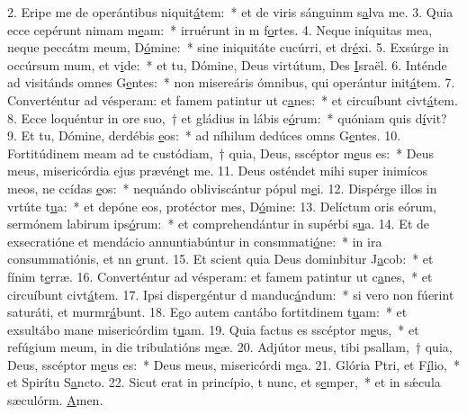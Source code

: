 2. Eripe me de operántibus niquit\uline{á}tem:~* et de viris sánguinm s\uline{a}lva me.
3. Quia ecce cepérunt nimam m\uline{e}am:~* irruérunt in m f\uline{o}rtes.
4. Neque iníquitas mea, neque peccátm meum, D\uline{ó}mine:~* sine iniquitáte cucúrri, et dr\uline{é}xi.
5. Exsúrge in occúrsum mum, et v\uline{i}de:~* et tu, Dómine, Deus virtútum, Des \uline{I}sraël.
6. Inténde ad visitánds omnes G\uline{e}ntes:~* non misereáris ómnibus, qui operántur init\uline{á}tem.
7. Converténtur ad vésperam: et famem patintur ut c\uline{a}nes:~* et circuíbunt civt\uline{á}tem.
8. Ecce loquéntur in ore suo,~† et gládius in lábis e\uline{ó}rum:~* quóniam quis d\uline{í}vit?
9. Et tu, Dómine, derdébis \uline{e}os:~* ad níhilum dedúces omns G\uline{e}ntes.
10. Fortitúdinem meam ad te custódiam,~† quia, Deus, sscéptor m\uline{e}us es:~* Deus meus, misericórdia ejus prævén\uline{e}t me.
11. Deus osténdet mihi super inimícos meos, ne ccídas \uline{e}os:~* nequándo obliviscántur pópul m\uline{e}i.
12. Dispérge illos in vrtúte t\uline{u}a:~* et depóne eos, protéctor mes, D\uline{ó}mine:
13. Delíctum oris eórum, sermónem labirum ips\uline{ó}rum:~* et comprehendántur in supérbi s\uline{u}a.
14. Et de exsecratióne et mendácio annuntiabúntur in consmmati\uline{ó}ne:~* in ira consummatiónis, et nn \uline{e}runt.
15. Et scient quia Deus dominbitur J\uline{a}cob:~* et fínim t\uline{e}rræ.
16. Converténtur ad vésperam: et famem patintur ut c\uline{a}nes,~* et circuíbunt civt\uline{á}tem.
17. Ipsi dispergéntur d manduc\uline{á}ndum:~* si vero non fúerint saturáti, et murmr\uline{á}bunt.
18. Ego autem cantábo fortitdinem t\uline{u}am:~* et exsultábo mane misericórdim t\uline{u}am.
19. Quia factus es sscéptor m\uline{e}us,~* et refúgium meum, in die tribulatións m\uline{e}æ.
20. Adjútor meus, tibi psallam,~† quia, Deus, sscéptor m\uline{e}us es:~* Deus meus, misericórdi m\uline{e}a.
21. Glória Ptri, et F\uline{í}lio,~* et Spirítu S\uline{a}ncto.
22. Sicut erat in princípio, t nunc, et s\uline{e}mper,~* et in sǽcula sæculórm. \uline{A}men.
